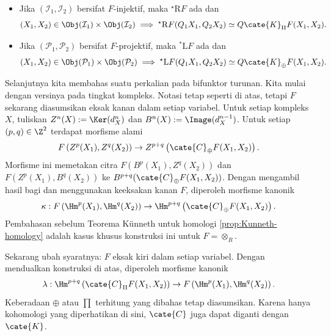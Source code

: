 \begin{itemize}
	\item Jika $(\mathcal{I}_1,\mathcal{I}_2)$ bersifat $F$-injektif, maka
	${}^\star\mathrm{R}F$ ada dan
	\begin{equation}\label{eqn:derived-bifunctor-1}
		(X_1, X_2) \in \Obj(\mathcal{I}_1) \times \Obj(\mathcal{I}_2) \implies {}^\star \mathrm{R}F(Q_1 X_1, Q_2 X_2) \simeq Q \cate{K}_{\Pi}F(X_1, X_2).
	\end{equation}
	\item Jika $(\mathcal{P}_1,\mathcal{P}_2)$ bersifat $F$-projektif, maka
	${}^*\mathrm{L}F$ ada dan
	\begin{equation}\label{eqn:derived-bifunctor-2}
		(X_1, X_2) \in \Obj(\mathcal{P}_1) \times \Obj(\mathcal{P}_2) \implies {}^\star \mathrm{L}F(Q_1 X_1, Q_2 X_2) \simeq Q \cate{K}_{\oplus}F(X_1, X_2).
	\end{equation}
\end{itemize}

Selanjutnya kita membahas suatu perkalian pada bifunktor turunan. Kita mulai
dengan versinya pada tingkat kompleks. Notasi tetap seperti di atas, tetapi
$F$ sekarang diasumsikan eksak kanan dalam setiap variabel. Untuk setiap
kompleks $X$, tuliskan $Z^n(X):=\Ker(d_X^n)$ dan
	$B^n(X):=\Image(d_X^{n-1})$. Untuk setiap $(p,q)\in\Z^2$ terdapat morfisme
	alami
\[ F\left( Z^p(X_1), Z^q(X_2) \right) \to Z^{p+q}\left( \cate{C}_{\oplus}F(X_1, X_2) \right). \]
Morfisme ini memetakan citra $F(B^p(X_1),Z^q(X_2))$ dan
$F(Z^p(X_1),B^q(X_2))$ ke
$B^{p+q}(\cate{C}_{\oplus}F(X_1,X_2))$. Dengan mengambil hasil bagi dan
menggunakan keeksakan kanan $F$, diperoleh morfisme kanonik
\[ \kappa: F\left(\Hm^p(X_1), \Hm^q(X_2)\right) \to \Hm^{p+q}\left( \cate{C}_{\oplus} F(X_1, X_2) \right). \]
Pembahasan sebelum Teorema Künneth untuk homologi
\ref{prop:Kunneth-homology} adalah kasus khusus konstruksi ini untuk
$F=\otimes_R$.

Sekarang ubah syaratnya: $F$ eksak kiri dalam setiap variabel. Dengan
mendualkan konstruksi di atas, diperoleh morfisme kanonik
\[ \lambda: \Hm^{p+q}\left( \cate{C}_{\Pi} F(X_1, X_2) \right) \to F\left( \Hm^p(X_1), \Hm^q(X_2) \right). \]
Keberadaan $\oplus$ atau $\prod$ terhitung yang dibahas tetap diasumsikan.
Karena hanya kohomologi yang diperhatikan di sini, $\cate{C}$ juga dapat
diganti dengan $\cate{K}$.

